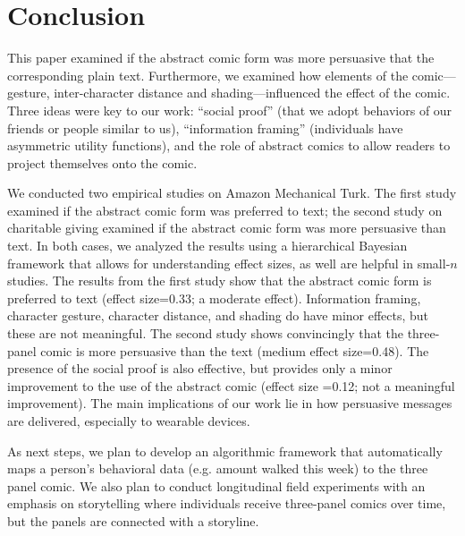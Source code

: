 \section{Conclusion}
\label{sec:Conclusion}

This paper examined if the abstract comic form was more persuasive that the corresponding plain text. Furthermore, we examined how elements of the comic---gesture, inter-character distance and shading---influenced the effect of the comic. Three ideas were key to our work: ``social proof'' (that we adopt behaviors of our friends or people similar to us), ``information framing'' (individuals have asymmetric utility functions), and the role of abstract comics to allow readers to project themselves onto the comic. 

We conducted two empirical studies on Amazon Mechanical Turk. The first study examined if the abstract comic form was preferred to text; the second study on charitable giving examined if the abstract comic form was more persuasive than text. In both cases, we analyzed the results using a hierarchical Bayesian framework that allows for understanding effect sizes, as well are helpful in small-$n$ studies. The results from the first study show that the abstract comic form is preferred to text (effect size=0.33; a moderate effect). Information framing, character gesture, character distance, and shading do have minor effects, but these are not meaningful. The second study shows convincingly that the three-panel comic is more persuasive than the text (medium effect size=0.48). The presence of the social proof is also effective, but provides only a minor improvement to the use of the abstract comic (effect size =0.12; not a meaningful improvement). The main implications of our work lie in how persuasive messages are delivered, especially to wearable devices.


As next steps, we plan to develop an algorithmic framework that automatically maps a person's behavioral data (e.g. amount walked this week) to the three panel comic. We also plan to conduct longitudinal field experiments with an emphasis on storytelling where individuals receive three-panel comics over time, but the panels are connected with a storyline.
